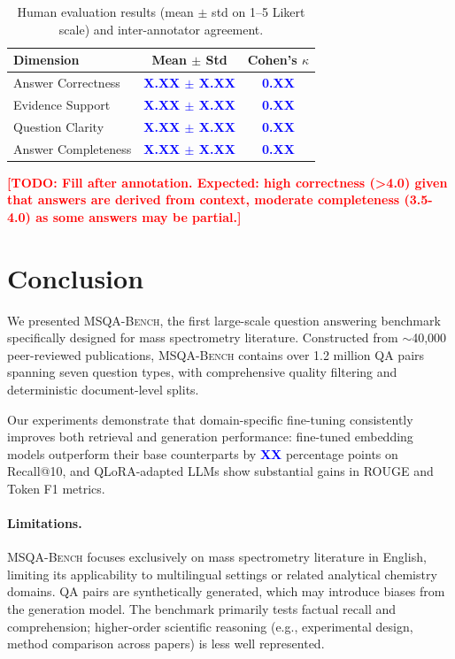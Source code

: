 \documentclass[11pt]{article}
\newcommand{\msqa}{\textsc{MSQA-Bench}}
\newcommand{\todo}[1]{\textcolor{red}{\textbf{[TODO: #1]}}}
\newcommand{\placeholder}[1]{\textcolor{blue}{\textbf{#1}}}
\begin{document}
\begin{table}[t]
\caption{Human evaluation results (mean $\pm$ std on 1--5 Likert scale) and inter-annotator agreement.}
\label{tab:human_eval}
\centering
\small
\begin{tabular}{lcc}
\toprule
\textbf{Dimension} & \textbf{Mean $\pm$ Std} & \textbf{Cohen's $\kappa$} \\
\midrule
Answer Correctness & \placeholder{X.XX $\pm$ X.XX} & \placeholder{0.XX} \\
Evidence Support & \placeholder{X.XX $\pm$ X.XX} & \placeholder{0.XX} \\
Question Clarity & \placeholder{X.XX $\pm$ X.XX} & \placeholder{0.XX} \\
Answer Completeness & \placeholder{X.XX $\pm$ X.XX} & \placeholder{0.XX} \\
\bottomrule
\end{tabular}
\end{table}

\todo{Fill after annotation. Expected: high correctness (>4.0) given that answers are derived from context, moderate completeness (3.5-4.0) as some answers may be partial.}

\section{Conclusion}
\label{sec:conclusion}

We presented \msqa{}, the first large-scale question answering benchmark specifically designed for mass spectrometry literature. Constructed from $\sim$40,000 peer-reviewed publications, \msqa{} contains over 1.2 million QA pairs spanning seven question types, with comprehensive quality filtering and deterministic document-level splits.

Our experiments demonstrate that domain-specific fine-tuning consistently improves both retrieval and generation performance: fine-tuned embedding models outperform their base counterparts by \placeholder{XX} percentage points on Recall@10, and QLoRA-adapted LLMs show substantial gains in ROUGE and Token F1 metrics.

\paragraph{Limitations.}
\msqa{} focuses exclusively on mass spectrometry literature in English, limiting its applicability to multilingual settings or related analytical chemistry domains. QA pairs are synthetically generated, which may introduce biases from the generation model. The benchmark primarily tests factual recall and comprehension; higher-order scientific reasoning (e.g., experimental design, method comparison across papers) is less well represented.
\end{document}
